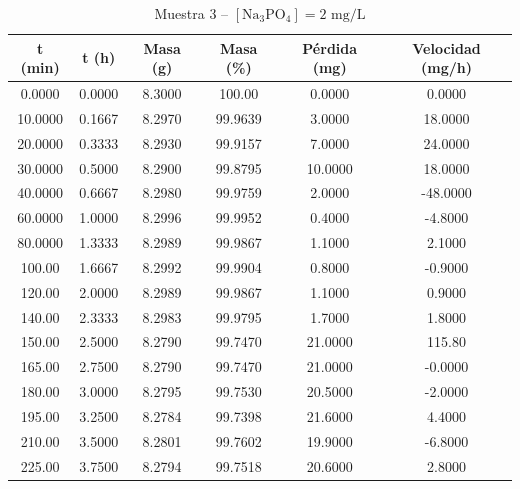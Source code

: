 \documentclass[11pt,a4paper]{article}
\begin{document}
\begin{table}[H]
\centering
\caption{Muestra 3 -- $[\text{Na}_3\text{PO}_4] = 2\text{ mg/L}$}
\label{tab:3_4_c2_m3}
\begin{tabular}{cccccc}
\toprule
t (min) & t (h) & Masa (g) & Masa (\%) & Pérdida (mg) & Velocidad (mg/h) \\
\midrule
0.0000 & 0.0000 & 8.3000 & 100.00 & 0.0000 & 0.0000 \\
10.0000 & 0.1667 & 8.2970 & 99.9639 & 3.0000 & 18.0000 \\
20.0000 & 0.3333 & 8.2930 & 99.9157 & 7.0000 & 24.0000 \\
30.0000 & 0.5000 & 8.2900 & 99.8795 & 10.0000 & 18.0000 \\
40.0000 & 0.6667 & 8.2980 & 99.9759 & 2.0000 & -48.0000 \\
60.0000 & 1.0000 & 8.2996 & 99.9952 & 0.4000 & -4.8000 \\
80.0000 & 1.3333 & 8.2989 & 99.9867 & 1.1000 & 2.1000 \\
100.00 & 1.6667 & 8.2992 & 99.9904 & 0.8000 & -0.9000 \\
120.00 & 2.0000 & 8.2989 & 99.9867 & 1.1000 & 0.9000 \\
140.00 & 2.3333 & 8.2983 & 99.9795 & 1.7000 & 1.8000 \\
150.00 & 2.5000 & 8.2790 & 99.7470 & 21.0000 & 115.80 \\
165.00 & 2.7500 & 8.2790 & 99.7470 & 21.0000 & -0.0000 \\
180.00 & 3.0000 & 8.2795 & 99.7530 & 20.5000 & -2.0000 \\
195.00 & 3.2500 & 8.2784 & 99.7398 & 21.6000 & 4.4000 \\
210.00 & 3.5000 & 8.2801 & 99.7602 & 19.9000 & -6.8000 \\
225.00 & 3.7500 & 8.2794 & 99.7518 & 20.6000 & 2.8000 \\
\bottomrule
\end{tabular}
\end{table}
\end{document}

